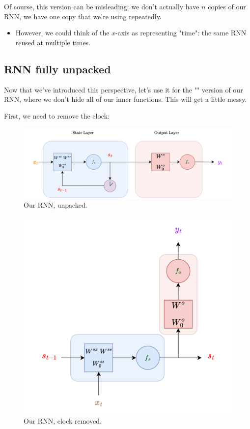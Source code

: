         Of course, this version can be misleading: we don't actually have $n$ copies of our RNN, we have one copy that we're using repeatedly.

        \begin{itemize}
            \item However, we could think of the $x$-axis as representing "time": the same RNN reused at multiple times.
        \end{itemize}

        

    \subsection{RNN fully unpacked}

        Now that we've introduced this perspective, let's use it for the "" version of our RNN, where we don't hide all of our inner functions. This will get a little messy.

        First, we need to remove the clock:

        \begin{figure}[H]
          \centering
          \includegraphics[width=\linewidth]{images/rnn_images/rnn_full.png}
          \caption*{Our RNN, unpacked.}
        \end{figure}

        \begin{figure}[H]
          \centering
          \includegraphics[width=.5\linewidth]{images/rnn_images/unrolled_rnn.png}
          \caption*{Our RNN, clock removed.}
        \end{figure}

